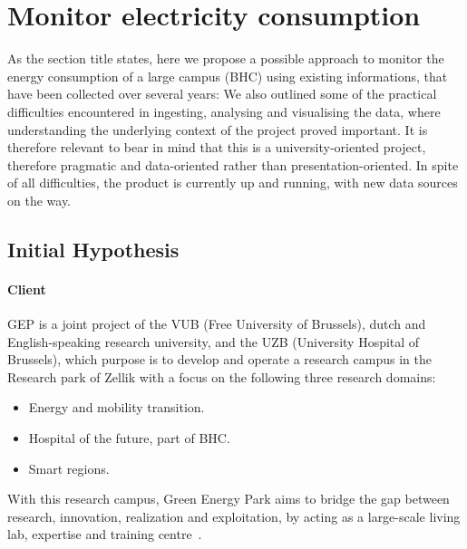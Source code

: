 \section{Monitor electricity consumption}
As the section title states, here we propose a possible approach to monitor the energy consumption of a large campus (\acs{BHC}) using existing informations, that have been collected over several years:
We also outlined some of the practical difficulties encountered in ingesting, analysing and visualising the data, 
where understanding the underlying context of the project proved important. 
It is therefore relevant to bear in mind that this is a university-oriented project, therefore pragmatic and data-oriented rather than presentation-oriented.
In spite of all difficulties, the product is currently up and running, with new data sources on the way.

\subsection{Initial Hypothesis}\label{sub:vub_initial_hp}
\paragraph{Client} 
\ac{GEP} is a joint project of the \ac{VUB} (Free University of Brussels), dutch and English-speaking research university, and the \ac{UZB} (University Hospital of Brussels), 
which purpose is to develop and operate a research campus in the Research park of Zellik with a focus on the following three research domains:
\begin{itemize}
    \item Energy and mobility transition.
    \item Hospital of the future, part of \ac{BHC}.
    \item Smart regions.
\end{itemize}
With this research campus, Green Energy Park aims to bridge the gap between research, innovation, realization and exploitation, by acting as a large-scale living lab, expertise and training centre~\cite{Misc:vub_2020_green}.
